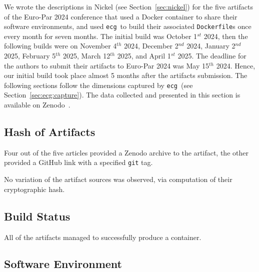 \documentclass[sigconf,natbib=false]{acmart}
\newcommand{\df}{\texttt{Dockerfile}}
\newcommand{\ecg}{\texttt{ecg}}
\begin{document}
We wrote the descriptions in Nickel (see Section~\ref{sec:nickel}) for the five artifacts of the Euro-Par 2024 conference that used a Docker container to share their software environments, and used \ecg\ to build their associated \df s once every month for seven months.
The initial build was October 1$^{st}$ 2024, then the following builds were on November 4$^{th}$ 2024, December 2$^{nd}$ 2024, January 2$^{nd}$ 2025, February 5$^{th}$ 2025, March 12$^{th}$ 2025, and April 1$^{st}$ 2025.
The deadline for the authors to submit their artifacts to Euro-Par 2024 was May 15$^{th}$ 2024.
Hence, our initial build took place almost 5 months after the artifacts submission.
The following sections follow the dimensions captured by \ecg\ (see Section~\ref{sec:ecg:capture}).
The data collected and presented in this section is available on Zenodo~\cite{dataset_europar24}.

\subsection{Hash of Artifacts}

Four out of the five articles provided a Zenodo archive to the artifact, the other provided a GitHub link with a specified \texttt{git} tag.

No variation of the artifact sources was observed, via computation of their cryptographic hash.

\subsection{Build Status}

All of the artifacts managed to successfully produce a container.

\subsection{Software Environment}
\end{document}
